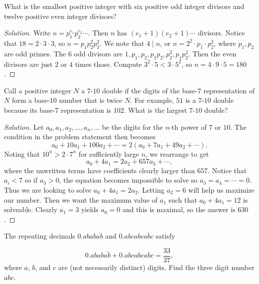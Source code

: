 \begin{prb}[2000 AIME II-4]
What is the smallest positive integer with six positive odd integer divisors and
twelve positive even integer divisors?
\end{prb}

\ifsolutions
\begin{proof}[Solution]
Write $n = p_1^{e_1} p_2^{e_2} \cdots$. Then $n$ has $(e_1 + 1)(e_2 + 1) \cdots$
divisors. Notice that $18 = 2 \cdot 3 \cdot 3$, so $n = p_1 p_2^2 p_3^2$. We
note that $4 \mid n$, or $n = 2^2 \cdot p_1 \cdot p_2^2$, where $p_1, p_2$ are
odd primes. The $6$ odd divisors are $1, p_1, p_2, p_1 p_2, p_2^2, p_1 p_2^2$.
Then the even divisors are just $2$ or $4$ times those. Compute $3^2 \cdot 5 < 3
\cdot 5^2$, so $n = 4 \cdot 9 \cdot 5 = \boxed{180}$.
\end{proof}
\fi

\begin{prb}[2001 AIME I-8]
Call a positive integer $N$ a $7$-$10$ double if the digits of the base-$7$
representation of $N$ form a base-$10$ number that is twice $N$. For example,
$51$ is a $7$-$10$ double because its base-$7$ representation is $102$. What is
the largest $7$-$10$ double?
\end{prb}

\ifsolutions
\begin{proof}[Solution]
Let $a_0, a_1, a_2, \dots, a_n, \dots$ be the digits for the $n$-th power of $7$
or $10$. The condition in the problem statement then becomes
\[ a_0 + 10 a_1 + 100 a_2 + \cdots = 2 (a_0 + 7 a_1 + 49 a_2 + \cdots). \]
Noting that $10^n > 2 \cdot 7^n$ for sufficiently large $n$, we rearrange to get
\[ a_0 + 4a_1 = 2a_2 + 657 a_3 + \cdots, \]
where the unwritten terms have coefficients clearly larger than $657$. Notice
that $a_i < 7$ so if $a_3 > 0$, the equation becomes impossible to solve so $a_3
= a_4 = \cdots = 0$. Thus we are looking to solve $a_0 + 4a_1 = 2a_2$. Letting
$a_2 = 6$ will help us maximize our number. Then we want the maximum value of
$a_1$ such that $a_0 + 4a_1 = 12$ is solveable. Clearly $a_1 = 3$ yields $a_0 =
0$ and this is maximal, so the answer is $\boxed{630}$.
\end{proof}
\fi

\begin{prb}[2014 AIME II-4]
The repeating decimals $0.abab \overline{ab}$ and $0.abcabc \overline{abc}$
satisfy

\[ 0.abab \overline{ab} + 0.abcabc \overline{abc} = \frac{33}{37}, \]
where $a$, $b$, and $c$ are (not necessarily distinct) digits. Find the three
digit number $abc$.
\end{prb}

